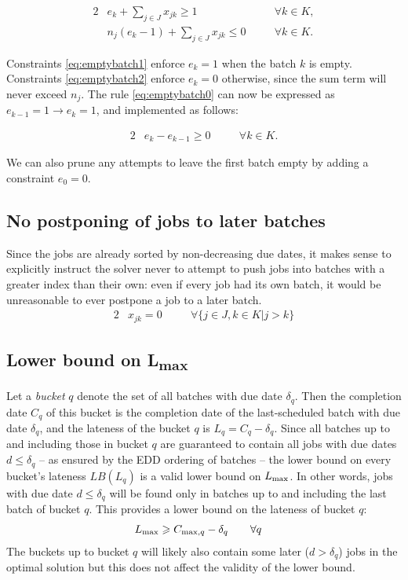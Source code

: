 \documentclass[13pt, letterpaper, oneside]{book}
\begin{document}
\begin{alignat}{2}
& e_k + \sum_{j \in J} x_{jk} \geq 1 \quad && \forall k \in K, \label{eq:emptybatch1} \\
& n_j (e_k-1) + \sum_{j \in J} x_{jk} \leq 0 \quad && \forall k \in K. \label{eq:emptybatch2}
\end{alignat}

Constraints \eqref{eq:emptybatch1} enforce $e_k = 1$ when the batch $k$ is
empty. Constraints \eqref{eq:emptybatch2} enforce $e_k = 0$ otherwise, since the
sum term will never exceed $n_j$. The rule \eqref{eq:emptybatch0} can now be
expressed as $e_{k-1} = 1 \rightarrow e_k = 1$, and implemented as follows:

\begin{alignat}{2}
& e_k - e_{k-1} \geq 0 \quad && \forall k \in K.
\end{alignat}

We can also prune any attempts to leave the first batch empty by adding a constraint $e_0 = 0$.


\subsection{No postponing of jobs to later batches}
Since the jobs are already sorted by non-decreasing due dates, it makes sense to explicitly instruct the solver never to attempt to push jobs into batches with a greater index than their own: even if every job had its own batch, it would be unreasonable to ever postpone a job to a later batch.
\begin{alignat}{2}
  & x_{jk} = 0 \quad && \forall \{j \in J, k \in K | j > k \} \label{eq:mipnopp}
\end{alignat}

\subsection[Lower bound on $\Lmax$]{Lower bound on {\sansitalicfont L}\textsubscript{max}}
Let a \textit{bucket} $q$ denote the set of all batches with due date $\delta_q$.
Then the completion date $C_q$ of this bucket is the completion date of the
last-scheduled batch with due date $\delta_q$, and the lateness of the bucket
$q$ is $L_q = C_q - \delta_q$. Since all batches up to and including those in
bucket $q$ are guaranteed to contain all jobs with due dates $d \leq \delta_q$
-- as ensured by the EDD ordering of batches -- the lower bound on every
bucket's lateness $LB(L_q)$ is a valid lower bound on $\Lmax$. In other words,
jobs with due date $d \leq \delta_q$ will be found only in batches up to and
including the last
batch of bucket $q$. This provides a lower bound on the lateness of bucket $q$:
\begin{alignat}{2}
& L_{\text{max}} \geqslant C_{\text{max},q} - \delta_q \quad && \forall q
\end{alignat}
The buckets up to bucket $q$ will likely also contain some later ($d >
\delta_q$) jobs in the optimal solution but this does not affect the validity of
the lower bound.
\end{document}
